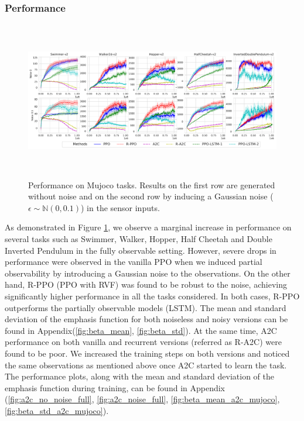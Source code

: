 \subsubsection{Performance}
\begin{figure}[H]
    \centering
    \includegraphics[width=\textwidth,height=6.9cm]{./fig/perf_mujoco.pdf}
    \caption{Performance on Mujoco tasks. Results on the first row are generated without noise  and on the second row by inducing a Gaussian noise ($\epsilon \sim \mathbb{N}(0,0.1)$) in the sensor inputs.}
    \label{fig:perf_mujoco_final}
\end{figure}
As demonstrated in Figure \ref{fig:perf_mujoco_final}, we observe a marginal increase in performance on several tasks such as Swimmer, Walker, Hopper, Half Cheetah and Double Inverted Pendulum in the fully observable setting. However, severe drops in performance were observed in the vanilla PPO when we induced partial observability by introducing a Gaussian noise to the observations. On the other hand, R-PPO (PPO with RVF) was found to be robust to the noise, achieving significantly higher performance in all the tasks considered. In both cases, R-PPO outperforms the partially observable models (LSTM). The mean and standard deviation of the emphasis function for both noiseless and noisy versions can be found in Appendix(\ref{fig:beta_mean}, \ref{fig:beta_std}). At the same time, A2C performance on both vanilla and recurrent versions (referred as R-A2C) were found to be poor. We increased the training steps on both versions and noticed the same observations as mentioned above once A2C started to learn the task. The performance plots, along with the mean and standard deviation of the emphasis function during training, can be found in Appendix (\ref{fig:a2c_no_noise_full}, \ref{fig:a2c_noise_full}, \ref{fig:beta_mean_a2c_mujoco},  \ref{fig:beta_std_a2c_mujoco}).

